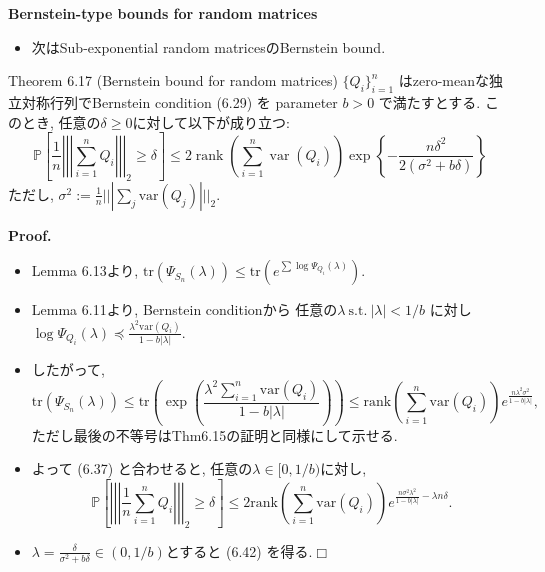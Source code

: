 \documentclass[unicode,aspectratio=169,11pt]{beamer}
\def\qed{\hfill $\Box$}
\newcommand{\var}{\mathrm{var}}
\newcommand{\bb}{\mathbb}
\newcommand{\trace}{\mathrm{tr}}
\begin{document}
\begin{frame}{}{}
  {\bf Bernstein-type bounds for random matrices}
  \begin{itemize}
    \item 次はSub-exponential random matricesのBernstein bound.
  \end{itemize}
  \begin{block}{Theorem 6.17 (Bernstein bound for random matrices)}
    $\{Q_i\}_{i=1}^n$ はzero-meanな独立対称行列でBernstein condition (6.29) を parameter $b > 0$ で満たすとする.
    このとき, 任意の$\delta \ge 0$に対して以下が成り立つ:
    \[
      \mathbb{P}\left[\frac{1}{n}\left|\left|\left|\sum_{i=1}^{n} Q_{i}\right|\right|\right|_{2} \geq \delta\right]
      \leq 2 \operatorname{rank}\left(\sum_{i=1}^{n} \operatorname{var}\left(Q_{i}\right)\right) \exp \left\{-\frac{n \delta^{2}}{2\left(\sigma^{2}+b \delta\right)}\right\}
      \tag{6.42}
    \]
    ただし, $\sigma^2 := \frac{1}{n}||| \sum_j \var(Q_j)|||_2$.
  \end{block}
\end{frame}

\begin{frame}{}{}
{\bf Proof.}
\begin{itemize}
  \item Lemma 6.13より, $\trace(\Psi_{S_n}(\lambda)) \le \trace(e^{\sum \log \Psi_{Q_i}(\lambda)})$.
  \item Lemma 6.11より, Bernstein conditionから 任意の$\lambda\ \mathrm{s.t.}\ |\lambda| < 1/b$ に対し $\log \Psi_{Q_i}(\lambda) \preceq \frac{\lambda^2 \var(Q_i)}{1 - b|\lambda|}$.
  \item したがって, 
        \[
          \trace\left(\Psi_{S_n}(\lambda)\right)
          \le \trace\left(\exp\left( \frac{\lambda^2 \sum_{i=1}^n \var(Q_i)}{1 - b|\lambda|} \right)\right)
          \le \mathrm{rank}\left(\sum_{i=1}^n \var(Q_i)\right)e^{\frac{n\lambda^2\sigma^2}{1 - b|\lambda|}},
        \]
        ただし最後の不等号はThm6.15の証明と同様にして示せる.
  \item よって (6.37) と合わせると, 任意の$\lambda \in [0, 1/b)$に対し, 
        \[
          \bb{P}\left[\left|\left|\left|\frac{1}{n}\sum_{i=1}^n Q_i \right|\right|\right|_2 \ge \delta\right]
          \le 2 \mathrm{rank}\left(\sum_{i=1}^n \var(Q_i)\right) e^{\frac{n\sigma^2 \lambda^2}{1 - b|\lambda|} - \lambda n \delta}.
        \]
  \item $\lambda  = \frac{\delta}{\sigma^2 + b\delta} \in (0, 1/b)$とすると (6.42) を得る.\qed
\end{itemize}
\end{frame}
\end{document}
